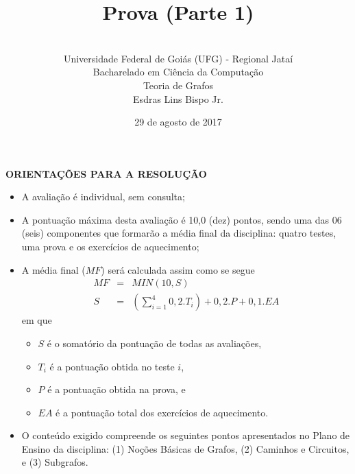 \documentclass[12pt,a4paper,oneside]{article}
\author{\\Universidade Federal de Goiás (UFG) - Regional Jataí\\Bacharelado em Ciência da Computação \\Teoria de Grafos \\Esdras Lins Bispo Jr.}
\title{\sc \huge Prova (Parte 1)}
\date{29 de agosto de 2017}
\begin{document}
\maketitle

{\bf ORIENTAÇÕES PARA A RESOLUÇÃO}

\footnotesize

\begin{itemize}
	\item A avaliação é individual, sem consulta;
	\item A pontuação máxima desta avaliação é 10,0 (dez) pontos, sendo uma das 06 (seis) componentes que formarão a média final da disciplina: quatro testes, uma prova e os exercícios de aquecimento;
	\item A média final ($MF$) será calculada assim como se segue
	\begin{eqnarray}
		MF & = & MIN(10, S) \nonumber \\
		S & = & (\sum_{i=1}^{4} 0,2.T_i ) + 0,2.P  + 0,1.EA \nonumber
	\end{eqnarray}
	em que 
	\begin{itemize}
		\item $S$ é o somatório da pontuação de todas as avaliações,
		\item $T_i$ é a pontuação obtida no teste $i$,
		\item $P$ é a pontuação obtida na prova, e
		\item $EA$ é a pontuação total dos exercícios de aquecimento.
	\end{itemize}
	\item O conteúdo exigido compreende os seguintes pontos apresentados no Plano de Ensino da disciplina: (1) Noções Básicas de Grafos, (2) Caminhos e Circuitos, e (3) Subgrafos.
\end{itemize}


\begin{center}
\end{center}

\newpage

\normalsize
\end{document}
